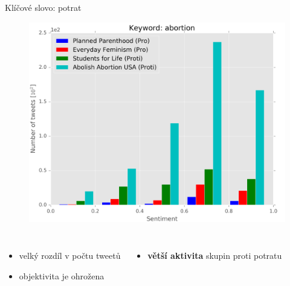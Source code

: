 \documentclass[notheorems,12pt]{beamer}
\begin{document}
\begin{frame}{Klíčové slovo: potrat}
    \begin{figure}
        \centering
        \includegraphics[scale=0.37]{./Pics/abortion.png}
    \end{figure}
    \vspace{-0.4cm}
    \begin{columns}
    \column{6cm}
    	\begin{itemize}
    		\item velký rozdíl v počtu tweetů
            \item objektivita je ohrožena
    	\end{itemize}
    \column{6cm}
    	\begin{itemize}
    		\item \textbf{větší aktivita} skupin proti potratu
    	\end{itemize}
    \end{columns}
\end{frame}
\end{document}

